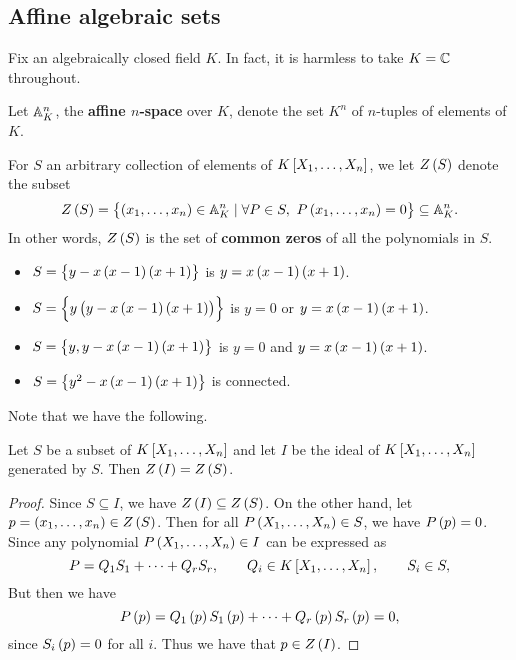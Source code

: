 \subsection{Affine algebraic sets}

Fix an algebraically closed field $ K $. In fact, it is harmless to take $ K = \mathbb{C} $ throughout.

\begin{definition}
Let $ \mathbb{A}_K^n $, the \textbf{affine $ n $-space} over $ K $, denote the set $ K^n $ of $ n $-tuples of elements of $ K $.
\end{definition}

For $ S $ an arbitrary collection of elements of $ K\sbr{X_1, \dots, X_n} $, we let $ Z\br{S} $ denote the subset
$$ Z\br{S} = \cbr{\br{x_1, \dots, x_n} \in \A_K^n \mid \forall P \in S, \ P\br{x_1, \dots, x_n} = 0} \subseteq \A_K^n. $$
In other words, $ Z\br{S} $ is the set of \textbf{common zeros} of all the polynomials in $ S $.

\begin{example*}
\hfill
\begin{itemize}
\item $ S = \cbr{y - x\br{x - 1}\br{x + 1}} $ is $ y = x\br{x - 1}\br{x + 1} $.
\item $ S = \cbr{y\br{y - x\br{x - 1}\br{x + 1}}} $ is $ y = 0 $ or $ y = x\br{x - 1}\br{x + 1} $.
\item $ S = \cbr{y, y - x\br{x - 1}\br{x + 1}} $ is $ y = 0 $ and $ y = x\br{x - 1}\br{x + 1} $.
\item $ S = \cbr{y^2 - x\br{x - 1}\br{x + 1}} $ is connected.
\end{itemize}
\end{example*}

\pagebreak

Note that we have the following.

\begin{lemma}
Let $ S $ be a subset of $ K\sbr{X_1, \dots, X_n} $ and let $ I $ be the ideal of $ K\sbr{X_1, \dots, X_n} $ generated by $ S $. Then $ Z\br{I} = Z\br{S} $.
\end{lemma}

\begin{proof}
Since $ S \subseteq I $, we have $ Z\br{I} \subseteq Z\br{S} $. On the other hand, let $ p = \br{x_1, \dots, x_n} \in Z\br{S} $. Then for all $ P\br{X_1, \dots, X_n} \in S $, we have $ P\br{p} = 0 $. Since any polynomial $ P\br{X_1, \dots, X_n} \in I $ can be expressed as
$$ P = Q_1S_1 + \dots + Q_rS_r, \qquad Q_i \in K\sbr{X_1, \dots, X_n}, \qquad S_i \in S, $$
But then we have
$$ P\br{p} = Q_1\br{p}S_1\br{p} + \dots + Q_r\br{p}S_r\br{p} = 0, $$
since $ S_i\br{p} = 0 $ for all $ i $. Thus we have that $ p \in Z\br{I} $.
\end{proof}


